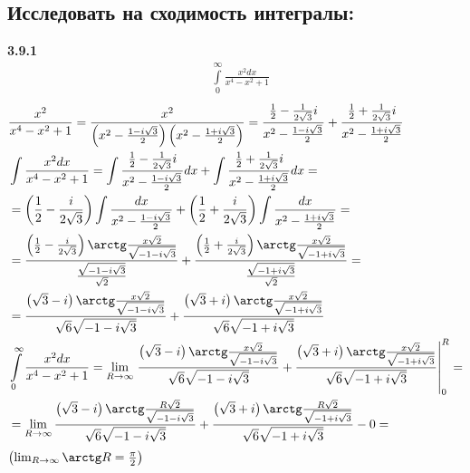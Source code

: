 \documentclass[a4paper, 12pt]{article}
\begin{document}
    \subsection{Исследовать на сходимость интегралы:}
    \textbf{3.9.1}
    \begin{align*}
    &\int\limits_0^\infty \frac{x^2dx}{x^4-x^2+1}
    \end{align*}
    \begin{align*}
     &\frac{x^2}{x^4-x^2+1} = 
     \frac{x^2}{\left(x^2 - \frac{1-i\sqrt{3}}{2}\right)\left(x^2-\frac{1+i\sqrt{3}}{2}\right)} = 
     \frac{\frac{1}{2}-\frac{1}{2\sqrt{3}}i}{x^2 - \frac{1-i\sqrt{3}}{2}} +
     \frac{\frac{1}{2}+\frac{1}{2\sqrt{3}}i}{x^2-\frac{1+i\sqrt{3}}{2}} \\
     &\int\frac{x^2dx}{x^4-x^2+1} = 
     \int\frac{\frac{1}{2}-\frac{1}{2\sqrt{3}}i}{x^2 - \frac{1-i\sqrt{3}}{2}}dx +
     \int\frac{\frac{1}{2}+\frac{1}{2\sqrt{3}}i}{x^2-\frac{1+i\sqrt{3}}{2}}dx = \\
     &=\left(\frac{1}{2}-\frac{i}{2\sqrt{3}}\right)\int\frac{dx}{x^2 - \frac{1-i\sqrt{3}}{2}} + 
     \left(\frac{1}{2}+\frac{i}{2\sqrt{3}}\right)\int\frac{dx}{x^2 - \frac{1+i\sqrt{3}}{2}} = \\
     & = \frac{\left(\frac{1}{2}-\frac{i}{2\sqrt{3}}\right)\arctg\frac{x\sqrt{2}}{\sqrt{-1-i\sqrt{3}}}}{\frac{\sqrt{-1-i\sqrt{3}}}{\sqrt{2}}} +
     \frac{\left(\frac{1}{2}+\frac{i}{2\sqrt{3}}\right)\arctg\frac{x\sqrt{2}}{\sqrt{-1+i\sqrt{3}}}}{\frac{\sqrt{-1+i\sqrt{3}}}{\sqrt{2}}} = \\
     &= \frac{\left(\sqrt{3}-i\right)\arctg\frac{x\sqrt{2}}{\sqrt{-1-i\sqrt{3}}}}{\sqrt{6}\sqrt{-1-i\sqrt{3}}} +
     \frac{\left(\sqrt{3}+i\right)\arctg\frac{x\sqrt{2}}{\sqrt{-1+i\sqrt{3}}}}{\sqrt{6}\sqrt{-1+i\sqrt{3}}} \\
     &\int\limits_0^\infty \frac{x^2dx}{x^4-x^2+1} = 
     \lim_{R \to \infty} \left.\frac{\left(\sqrt{3}-i\right)\arctg\frac{x\sqrt{2}}{\sqrt{-1-i\sqrt{3}}}}{\sqrt{6}\sqrt{-1-i\sqrt{3}}} +
     \frac{\left(\sqrt{3}+i\right)\arctg\frac{x\sqrt{2}}{\sqrt{-1+i\sqrt{3}}}}{\sqrt{6}\sqrt{-1+i\sqrt{3}}}\right|_0^R = \\
     &= \lim_{R \to \infty} \frac{\left(\sqrt{3}-i\right)\arctg\frac{R\sqrt{2}}{\sqrt{-1-i\sqrt{3}}}}{\sqrt{6}\sqrt{-1-i\sqrt{3}}} +
     \frac{\left(\sqrt{3}+i\right)\arctg\frac{R\sqrt{2}}{\sqrt{-1+i\sqrt{3}}}}{\sqrt{6}\sqrt{-1+i\sqrt{3}}} -0 = \\
    \end{align*}
    $\left(\lim_{R \to \infty} \arctg R = \frac{\pi}{2}\right)$
\end{document}
